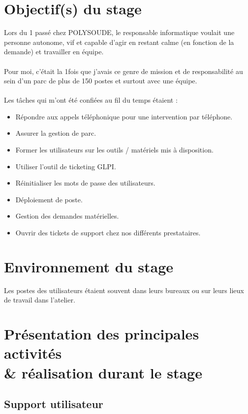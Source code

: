 \documentclass[11pt,a4paper,twoside]{article}
\begin{document}
\newpage
\section{Objectif(s) du stage}

Lors du 1\ier{} passé chez POLYSOUDE, le responsable informatique voulait une personne autonome, vif et capable d'agir en restant calme (en fonction de la demande) et travailler en équipe.
\\ \\
Pour moi, c'était la 1\ier fois que j'avais ce genre de mission et de responsabilité au sein d'un parc de plus de 150 postes et surtout avec une équipe.
\\ \\
Les tâches qui m'ont été confiées au fil du temps étaient : 
\begin{itemize}
    \item Répondre aux appels téléphonique pour une intervention par téléphone.
    \item Assurer la gestion de parc.
    \item Former les utilisateurs sur les outils / matériels mis à disposition.
    \item Utiliser l'outil de ticketing GLPI.
    \item Réinitialiser les mots de passe des utilisateurs.
    \item Déploiement de poste.
    \item Gestion des demandes matérielles.
    \item Ouvrir des tickets de support chez nos différents prestataires.
\end{itemize}

\newpage
\section{Environnement du stage}
Les postes des utilisateurs étaient souvent dans leurs bureaux ou sur leurs lieux de travail dans l'atelier. \\

\newpage
\section{Présentation des principales activités \\ \& réalisation durant le stage}
\subsection{Support utilisateur}
\end{document}
